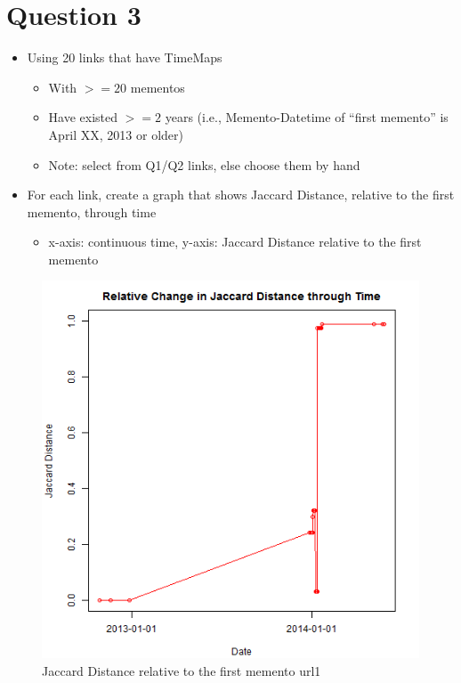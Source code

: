 
\section{Question 3}
\label{part1}

\begin{itemize}
\item Using 20 links that have TimeMaps
\begin{itemize}
\item With $>= 20$ mementos
\item Have existed  $>= 2$ years (i.e., Memento-Datetime of “first memento” is April XX, 2013 or older)
\item Note: select from Q1/Q2 links, else choose them by hand
\end{itemize}
\item For each link, create a graph that shows Jaccard Distance, relative to the first memento, through time
\begin{itemize}
\item x-axis: continuous time, y-axis: Jaccard Distance relative to the first memento
\end{itemize}
\end{itemize}
\begin{figure}[ht]
	\begin{center}
		 \includegraphics[scale=0.60]{url1}
		  \caption{Jaccard Distance relative to the first memento url1}
	 \end{center}
\end{figure}
